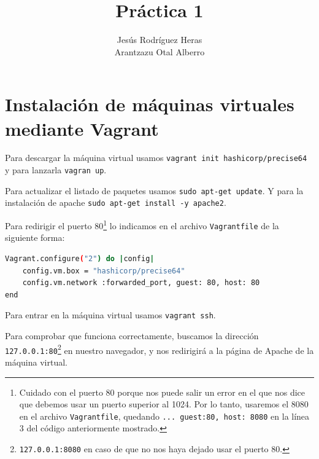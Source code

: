 \documentclass[12pt,letterpaper]{article}
\title{Práctica 1}
\author{Jesús Rodríguez Heras\\
	Arantzazu Otal Alberro}
\begin{document}
	
	\maketitle
%			
	\thispagestyle{empty}
	\newpage
	
	
	
	
	
	\lstset{language=bash, numbers=left, numberstyle=\tiny, numbersep=10pt, firstnumber=1, stepnumber=1, basicstyle=\small\ttfamily, tabsize=1, extendedchars=true, inputencoding=latin1}
	
\section{Instalación de máquinas virtuales mediante Vagrant}
Para descargar la máquina virtual usamos \texttt{vagrant init hashicorp/precise64} y para lanzarla \texttt{vagran up}.

Para actualizar el listado de paquetes usamos \texttt{sudo apt-get update}. Y para la instalación de apache \texttt{sudo apt-get install -y apache2}.

Para redirigir el puerto 80\footnote{Cuidado con el puerto 80 porque nos puede salir un error en el que nos dice que debemos usar un puerto superior al 1024. Por lo tanto, usaremos el 8080 en el archivo \texttt{Vagrantfile}, quedando \texttt{... guest:80, host: 8080} en la línea 3 del código anteriormente mostrado.} lo indicamos en el archivo \texttt{Vagrantfile} de la siguiente forma:
\begin{lstlisting}[language=Bash]
Vagrant.configure("2") do |config|
    config.vm.box = "hashicorp/precise64"
    config.vm.network :forwarded_port, guest: 80, host: 80
end
\end{lstlisting}

Para entrar en la máquina virtual usamos \texttt{vagrant ssh}.

Para comprobar que funciona correctamente, buscamos la dirección \texttt{127.0.0.1:80}\footnote{\texttt{127.0.0.1:8080} en caso de que no nos haya dejado usar el puerto 80.} en nuestro navegador, y nos redirigirá a la página de Apache de la máquina virtual.
\end{document}
